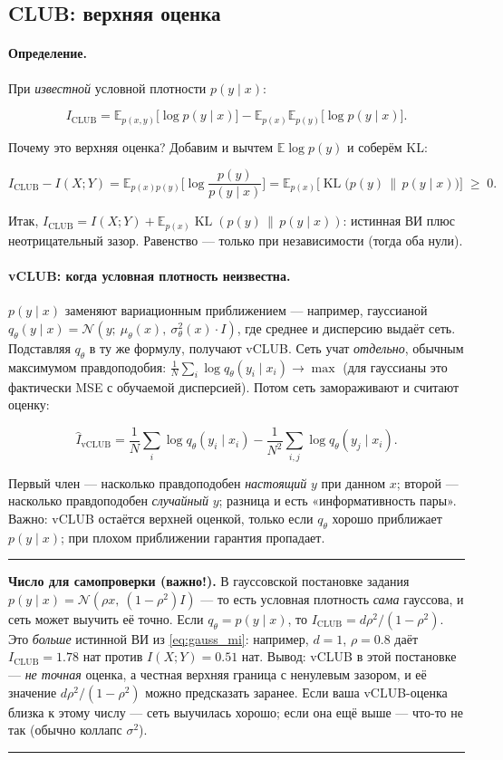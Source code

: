 \documentclass[11pt]{article}
\newcommand{\MI}{I(X;Y)}
\newcommand{\KL}{\operatorname{KL}}
\newcommand{\EE}{\mathbb{E}}
\newenvironment{exbox}{%
  \par\medskip\noindent
  \begin{minipage}[t]{\linewidth}
  \color{accent}\rule[2pt]{\linewidth}{0.6pt}\color{black}
  \vspace{0.4em}\noindent\small
}{%
  \vspace{0.4em}
  \color{accent}\rule[2pt]{\linewidth}{0.6pt}\color{black}
  \end{minipage}\par\medskip
}
\begin{document}
\subsection{CLUB: верхняя оценка}

\paragraph{Определение.} При \emph{известной} условной плотности $p(y\mid x)$:

\[
I_{\text{CLUB}} = \EE_{p(x,y)}\big[\log p(y\mid x)\big] - \EE_{p(x)}\EE_{p(y)}\big[\log p(y\mid x)\big].
\]

Почему это верхняя оценка? Добавим и вычтем $\EE\log p(y)$ и соберём KL:

\[
I_{\text{CLUB}} - \MI
= \EE_{p(x)p(y)}\Big[\log\frac{p(y)}{p(y\mid x)}\Big]
= \EE_{p(x)}\Big[\KL\big(p(y)\,\big\|\,p(y\mid x)\big)\Big] \;\ge\; 0.
\]

Итак, $I_{\text{CLUB}}=\MI+\EE_{p(x)}\KL(p(y)\,\|\,p(y\mid x))$: истинная ВИ плюс неотрицательный зазор. Равенство — только при независимости (тогда оба нули).

\paragraph{vCLUB: когда условная плотность неизвестна.} $p(y\mid x)$ заменяют вариационным приближением — например, гауссианой $q_\theta(y\mid x)=\mathcal{N}(y;\ \mu_\theta(x),\ \sigma^2_\theta(x)\cdot I)$, где среднее и дисперсию выдаёт сеть. Подставляя $q_\theta$ в ту же формулу, получают vCLUB. Сеть учат \emph{отдельно}, обычным максимумом правдоподобия: $\frac1N\sum_i\log q_\theta(y_i\mid x_i)\to\max$ (для гауссианы это фактически MSE с обучаемой дисперсией). Потом сеть замораживают и считают оценку:

\[
\hat I_{\text{vCLUB}} = \frac1N\sum_i\log q_\theta(y_i\mid x_i) - \frac1{N^2}\sum_{i,j}\log q_\theta(y_j\mid x_i).
\]

Первый член — насколько правдоподобен \emph{настоящий} $y$ при данном $x$; второй — насколько правдоподобен \emph{случайный} $y$; разница и есть «информативность пары». Важно: vCLUB остаётся верхней оценкой, только если $q_\theta$ хорошо приближает $p(y\mid x)$; при плохом приближении гарантия пропадает.

\begin{exbox}
\textbf{Число для самопроверки (важно!).} В гауссовской постановке задания $p(y\mid x)=\mathcal{N}(\rho x,\ (1-\rho^2)I)$ — то есть условная плотность \emph{сама} гауссова, и сеть может выучить её точно. Если $q_\theta=p(y\mid x)$, то $I_{\text{CLUB}} = d\rho^2/(1-\rho^2)$. Это \emph{больше} истинной ВИ из \eqref{eq:gauss_mi}: например, $d=1$, $\rho=0.8$ даёт $I_{\text{CLUB}}=1.78$ нат против $\MI=0.51$ нат. Вывод: vCLUB в этой постановке — \emph{не точная} оценка, а честная верхняя граница с ненулевым зазором, и её значение $d\rho^2/(1-\rho^2)$ можно предсказать заранее. Если ваша vCLUB-оценка близка к этому числу — сеть выучилась хорошо; если она ещё выше — что-то не так (обычно коллапс $\sigma^2$).
\end{exbox}
\end{document}
